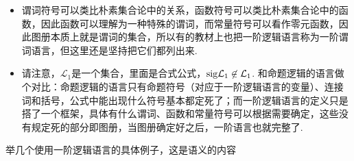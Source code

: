 \documentclass[main.tex]{subfiles}
\begin{document}
\begin{itemize}
    \item 谓词符号可以类比朴素集合论中的关系，函数符号可以类比朴素集合论中的函数，因此函数可以理解为一种特殊的谓词，而常量符号可以看作零元函数，因此图册本质上就是谓词的集合，所以有的教材上也把一阶逻辑语言称为一阶谓词语言，但这里还是坚持把它们都列出来.
    \item 请注意，\(\mathcal{L}_1\)是一个集合，里面是合式公式，\({\rm sig}\mathcal{L}_1 \not \in \mathcal{L}_1\). 和命题逻辑的语言做个对比：命题逻辑的语言只有命题符号（对应于一阶逻辑语言的变量）、连接词和括号，公式中能出现什么符号基本都定死了；而一阶逻辑语言的定义只是搭了一个框架，具体有什么谓词、函数和常量符号可以根据需要确定，这些没有规定死的部分即图册，当图册确定好之后，一阶语言也就完整了.
\end{itemize}

举几个使用一阶逻辑语言的具体例子，这是语义的内容
\end{document}
